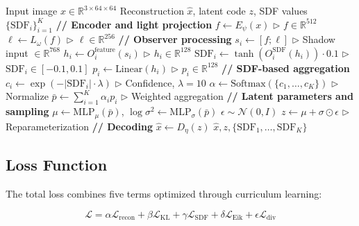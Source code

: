 \documentclass[10pt,twocolumn,letterpaper]{article}
\begin{document}
\begin{algorithm}[p]
\caption{Multi-Perspective SDF-VAE Forward Pass}
\label{alg:forward}
\begin{algorithmic}[1]
\REQUIRE Input image $x \in \mathbb{R}^{3 \times 64 \times 64}$
\ENSURE Reconstruction $\hat{x}$, latent code $z$, SDF values $\{\text{SDF}_i\}_{i=1}^K$
\STATE \textbf{// Encoder and light projection}
\STATE $f \leftarrow E_\psi(x)$ \hfill $\triangleright$ $f \in \mathbb{R}^{512}$
\STATE $\ell \leftarrow L_\omega(f)$ \hfill $\triangleright$ $\ell \in \mathbb{R}^{256}$
\STATE
\STATE \textbf{// Observer processing}
    \STATE $s_i \leftarrow [f; \ell]$ \hfill $\triangleright$ Shadow input $\in \mathbb{R}^{768}$
    \STATE $h_i \leftarrow O_i^{\text{feature}}(s_i)$ \hfill $\triangleright$ $h_i \in \mathbb{R}^{128}$
    \STATE $\text{SDF}_i \leftarrow \tanh(O_i^{\text{SDF}}(h_i)) \cdot 0.1$ \hfill $\triangleright$ $\text{SDF}_i \in [-0.1, 0.1]$
    \STATE $p_i \leftarrow \text{Linear}(h_i)$ \hfill $\triangleright$ $p_i \in \mathbb{R}^{128}$
\ENDFOR
\STATE
\STATE \textbf{// SDF-based aggregation}
    \STATE $c_i \leftarrow \exp(-|\text{SDF}_i| \cdot \lambda)$ \hfill $\triangleright$ Confidence, $\lambda=10$
\ENDFOR
\STATE $\alpha \leftarrow \text{Softmax}(\{c_1, \ldots, c_K\})$ \hfill $\triangleright$ Normalize
\STATE $\bar{p} \leftarrow \sum_{i=1}^K \alpha_i p_i$ \hfill $\triangleright$ Weighted aggregation
\STATE
\STATE \textbf{// Latent parameters and sampling}
\STATE $\mu \leftarrow \text{MLP}_\mu(\bar{p})$, \quad $\log \sigma^2 \leftarrow \text{MLP}_\sigma(\bar{p})$
\STATE $\epsilon \sim \mathcal{N}(0, I)$
\STATE $z \leftarrow \mu + \sigma \odot \epsilon$ \hfill $\triangleright$ Reparameterization
\STATE
\STATE \textbf{// Decoding}
\STATE $\hat{x} \leftarrow D_\eta(z)$
\STATE
\RETURN $\hat{x}, z, \{\text{SDF}_1, \ldots, \text{SDF}_K\}$
\end{algorithmic}
\end{algorithm}

\subsection{Loss Function}

The total loss combines five terms optimized through curriculum learning:

\begin{equation}
\mathcal{L} = \alpha \mathcal{L}_{\text{recon}} + \beta \mathcal{L}_{\text{KL}} + \gamma \mathcal{L}_{\text{SDF}} + \delta \mathcal{L}_{\text{Eik}} + \epsilon \mathcal{L}_{\text{div}}
\end{equation}
\end{document}
